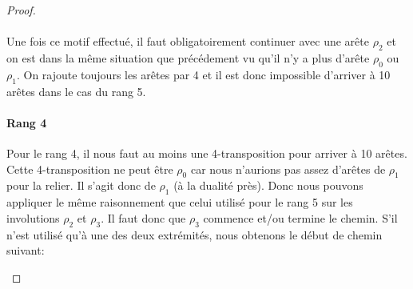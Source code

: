 \begin{proof}
\begin{figure}[H]
\begin{center}
      \caption{}
    \end{center}
  \end{figure}

  \paragraph{}
  Une fois ce motif effectué, il faut obligatoirement continuer avec une arête $\rho_2$ et on est dans la même situation que précédement vu qu'il n'y a plus d'arête $\rho_0$ ou $\rho_1$. On rajoute toujours les arêtes par 4 et il est donc impossible d'arriver à 10 arêtes dans le cas du rang 5.

  \paragraph{Rang 4} Pour le rang 4, il nous faut au moins une 4-transposition pour arriver à 10 arêtes. Cette 4-transposition ne peut être $\rho_0$ car nous n'aurions pas assez d'arêtes de $\rho_1$ pour la relier. Il s'agit donc de $\rho_1$ (à la dualité près). Donc nous pouvons appliquer le même raisonnement que celui utilisé pour le rang 5 sur les involutions $\rho_2$ et $\rho_3$. Il faut donc que $\rho_3$ commence et/ou termine le chemin. S'il n'est utilisé qu'à une des deux extrémités, nous obtenons le début de chemin suivant:

  \begin{figure}[H]
    \begin{center}
\end{center}
\end{figure}
\end{proof}
